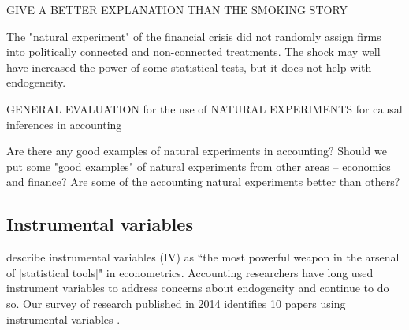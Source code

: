 \documentclass[11pt]{amsart}
\begin{document}
GIVE A BETTER EXPLANATION THAN THE SMOKING STORY

The "natural experiment" of the financial crisis did not randomly assign firms into politically connected and non-connected treatments.  The shock may well have increased the power of some statistical tests, but it does not help with endogeneity.




GENERAL EVALUATION for the use of NATURAL EXPERIMENTS for causal inferences in accounting 

Are there any good examples of natural experiments in accounting?  Should we put some "good examples" of natural experiments from other areas -- economics and finance?  Are some of the accounting natural experiments better than others?

\subsection{Instrumental variables}
\citet[p.114]{Angrist:2008vk} describe instrumental variables (IV) as ``the most powerful weapon in the arsenal of [statistical tools]" in econometrics. 
Accounting researchers have long used instrument variables to address concerns about endogeneity \citep{Larcker:2010fq} and continue to do so.  Our survey of research published in 2014 identifies 10 papers using instrumental variables \citep{Cannon:2014im,Cohen:2014jl,Kim:2014fm,Vermeer:2014bs,Fox:2014io,Guedhami:2013cj,Houston:2014hv,deFranco:2014ct,Erkens:2014hj,Correia:2014fp}. 
\end{document}
